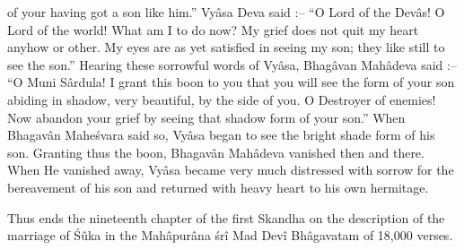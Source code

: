of your having got a son like him.'' Vy\^asa Deva said :-- ``O Lord of the Dev\^as! O Lord of the world! What am I to do now? My grief does not quit my heart anyhow or other. My eyes are as yet satisfied in seeing my son; they like still to see the son.'' Hearing these sorrowful words of Vy\^asa, Bhag\^avan Mah\^adeva said :-- ``O Muni S\^ardula! I grant this boon to you that you will see the form of your son abiding in shadow, very beautiful, by the side of you. O Destroyer of enemies! Now abandon your grief by seeing that shadow form of your son.'' When Bhagav\^an Mahe\'svara said so, Vy\^asa began to see the bright shade form of his son. Granting thus the boon, Bhagav\^an Mah\^adeva vanished then and there. When He vanished away, Vy\^asa became very much distressed with sorrow for the bereavement of his son and returned with heavy heart to his own hermitage.

Thus ends the nineteenth chapter of the first Skandha on the description of the marriage of \'S\^uka in the Mah\^apur\^ana \'sr\^i Mad Dev\^i Bh\^agavatam of 18,000 verses.